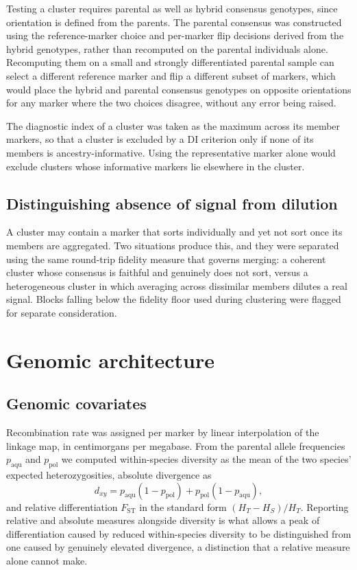\documentclass[11pt]{article}
\begin{document}
Testing a cluster requires parental as well as hybrid consensus genotypes, since
orientation is defined from the parents. The parental consensus was constructed
using the reference-marker choice and per-marker flip decisions derived from the
hybrid genotypes, rather than recomputed on the parental individuals alone.
Recomputing them on a small and strongly differentiated parental sample can
select a different reference marker and flip a different subset of markers,
which would place the hybrid and parental consensus genotypes on opposite
orientations for any marker where the two choices disagree, without any error
being raised.

The diagnostic index of a cluster was taken as the maximum across its member
markers, so that a cluster is excluded by a DI criterion only if none of its
members is ancestry-informative. Using the representative marker alone would
exclude clusters whose informative markers lie elsewhere in the cluster.

\subsection{Distinguishing absence of signal from dilution}
A cluster may contain a marker that sorts individually and yet not sort once its
members are aggregated. Two situations produce this, and they were separated
using the same round-trip fidelity measure that governs merging: a coherent
cluster whose consensus is faithful and genuinely does not sort, versus a
heterogeneous cluster in which averaging across dissimilar members dilutes a real
signal. Blocks falling below the fidelity floor used during clustering were
flagged for separate consideration.

\section{Genomic architecture}

\subsection{Genomic covariates}
Recombination rate was assigned per marker by linear interpolation of the
linkage map, in centimorgans per megabase. From the parental allele frequencies
$p_{\mathrm{aqu}}$ and $p_{\mathrm{pol}}$ we computed within-species diversity as
the mean of the two species' expected heterozygosities, absolute divergence as
\begin{equation}
d_{xy} = p_{\mathrm{aqu}}(1-p_{\mathrm{pol}}) + p_{\mathrm{pol}}(1-p_{\mathrm{aqu}}),
\end{equation}
and relative differentiation $F_{\mathrm{ST}}$ in the standard form
$(H_T - H_S)/H_T$. Reporting relative and absolute measures alongside diversity
is what allows a peak of differentiation caused by reduced within-species
diversity to be distinguished from one caused by genuinely elevated divergence,
a distinction that a relative measure alone cannot make.
\end{document}
